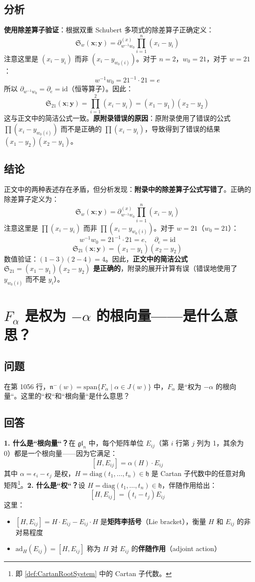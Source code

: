 \subsection{分析}\textbf{使用除差算子验证}：根据双重 Schubert 多项式的除差算子正确定义：$$\mathfrak{S}_w(\mathbf{x}; \mathbf{y}) = \partial_{w^{-1}w_0}^{(x)} \prod_{i=1}^n (x_i - y_i)$$注意这里是 $(x_i - y_i)$ 而非 $(x_i - y_{w_0(i)})$。对于 $n=2$，$w_0 = 21$，对于 $w = 21$：$$w^{-1}w_0 = 21^{-1} \cdot 21 = e$$所以 $\partial_{w^{-1}w_0} = \partial_e = \text{id}$（恒等算子）。因此：$$\mathfrak{S}_{21}(\mathbf{x}; \mathbf{y}) = \prod_{i=1}^2 (x_i - y_i) = (x_1 - y_1)(x_2 - y_2)$$这与正文中的简洁公式一致。\textbf{原附录错误的原因}：原附录使用了错误的公式 $\prod(x_i - y_{w_0(i)})$ 而不是正确的 $\prod(x_i - y_i)$，导致得到了错误的结果 $(x_1-y_2)(x_2-y_1)$。
\subsection{结论}正文中的两种表述存在矛盾，但分析发现：\textbf{附录中的除差算子公式写错了}。正确的除差算子定义为：$$\mathfrak{S}_w(\mathbf{x}; \mathbf{y}) = \partial_{w^{-1}w_0}^{(x)} \prod_{i=1}^n (x_i - y_i)$$注意这里是 $\prod(x_i - y_i)$ 而非 $\prod(x_i - y_{w_0(i)})$。对于 $w = 21$（$w_0 = 21$）：$$w^{-1}w_0 = 21^{-1} \cdot 21 = e, \quad \partial_{e} = \mathrm{id}$$$$\mathfrak{S}_{21}(\mathbf{x}; \mathbf{y}) = (x_1 - y_1)(x_2 - y_2)$$数值验证：$(1-3)(2-4) = 4$。因此，\textbf{正文中的简洁公式 $\mathfrak{S}_{21} = (x_1-y_1)(x_2-y_2)$ 是正确的}，附录的展开计算有误（错误地使用了 $y_{w_0(i)}$ 而不是 $y_i$）。
\section{$F_\alpha$ 是权为 $-\alpha$ 的根向量——是什么意思？}\label{sec:RootVectorWeight}\subsection*{问题}在第 1056 行，$\mathfrak{n}^-(w) = \mathrm{span}\{F_\alpha \mid \alpha \in J(w)\}$ 中，$F_\alpha$ 是``权为 $-\alpha$ 的根向量``。这里的``权``和``根向量``是什么意思？\subsection*{回答}\textbf{1. 什么是``根向量``？}在 $\mathfrak{gl}_n$ 中，每个矩阵单位 $E_{ij}$（第 $i$ 行第 $j$ 列为 1，其余为 0）都是一个根向量——因为它满足：$$[H, E_{ij}] = \alpha(H) \cdot E_{ij}$$其中 $\alpha = \epsilon_i - \epsilon_j$ 是权，$H = \mathrm{diag}(t_1, \ldots, t_n) \in \mathfrak{h}$ 是 Cartan 子代数中的任意对角矩阵\footnote{即 \cref{def:CartanRootSystem} 中的 Cartan 子代数。}。\textbf{2. 什么是``权``？}设 $H = \mathrm{diag}(t_1, \ldots, t_n) \in \mathfrak{h}$，伴随作用给出：$$[H, E_{ij}] = (t_i - t_j) E_{ij}$$这里：
\begin{itemize}
\item $[H, E_{ij}] = H \cdot E_{ij} - E_{ij} \cdot H$ 是\textbf{矩阵李括号}（Lie bracket），衡量 $H$ 和 $E_{ij}$ 的非对易程度\item $\mathrm{ad}_H(E_{ij}) = [H, E_{ij}]$ 称为 $H$ 对 $E_{ij}$ 的\textbf{伴随作用}（adjoint action）
\end{itemize}

